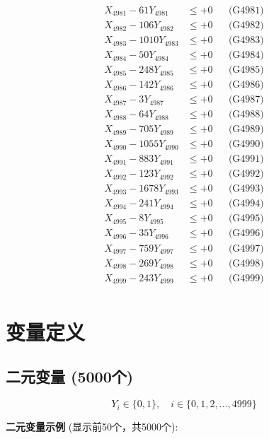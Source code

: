 \documentclass[a4paper,10pt]{article}
\begin{document}
{\begin{align}
\allowbreak
X_{4981} - 61Y_{4981} &\leq +0 && \text{(G4981)} \\
X_{4982} - 106Y_{4982} &\leq +0 && \text{(G4982)} \\
X_{4983} - 1010Y_{4983} &\leq +0 && \text{(G4983)} \\
X_{4984} - 50Y_{4984} &\leq +0 && \text{(G4984)} \\
X_{4985} - 248Y_{4985} &\leq +0 && \text{(G4985)} \\
X_{4986} - 142Y_{4986} &\leq +0 && \text{(G4986)} \\
X_{4987} - 3Y_{4987} &\leq +0 && \text{(G4987)} \\
X_{4988} - 64Y_{4988} &\leq +0 && \text{(G4988)} \\
X_{4989} - 705Y_{4989} &\leq +0 && \text{(G4989)} \\
X_{4990} - 1055Y_{4990} &\leq +0 && \text{(G4990)} \\
\allowbreak
X_{4991} - 883Y_{4991} &\leq +0 && \text{(G4991)} \\
X_{4992} - 123Y_{4992} &\leq +0 && \text{(G4992)} \\
X_{4993} - 1678Y_{4993} &\leq +0 && \text{(G4993)} \\
X_{4994} - 241Y_{4994} &\leq +0 && \text{(G4994)} \\
X_{4995} - 8Y_{4995} &\leq +0 && \text{(G4995)} \\
X_{4996} - 35Y_{4996} &\leq +0 && \text{(G4996)} \\
X_{4997} - 759Y_{4997} &\leq +0 && \text{(G4997)} \\
X_{4998} - 269Y_{4998} &\leq +0 && \text{(G4998)} \\
X_{4999} - 243Y_{4999} &\leq +0 && \text{(G4999)} \\
\end{align}
}

\section{变量定义}

\subsection{二元变量 (5000个)}

\begin{equation}
Y_i \in \{0,1\}, \quad i \in \{0, 1, 2, \ldots, 4999\}
\end{equation}

\textbf{二元变量示例} (显示前50个，共5000个):
\end{document}
